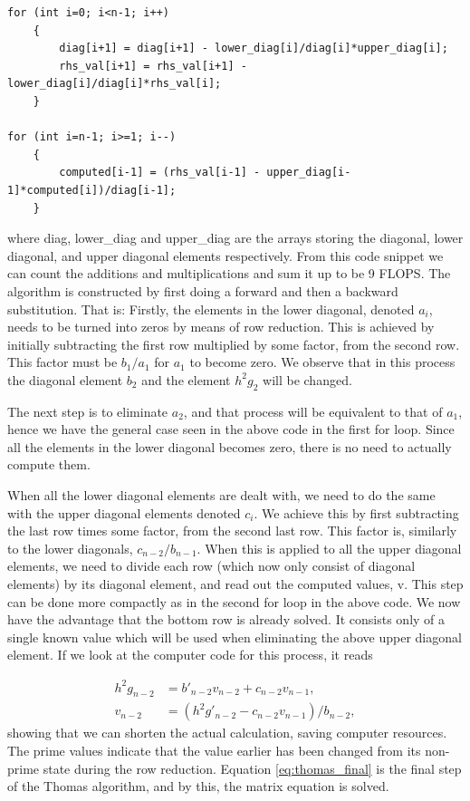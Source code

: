 \documentclass{emulateapj}
\begin{document}
\begin{lstlisting}
for (int i=0; i<n-1; i++)
    {
        diag[i+1] = diag[i+1] - lower_diag[i]/diag[i]*upper_diag[i];
        rhs_val[i+1] = rhs_val[i+1] - lower_diag[i]/diag[i]*rhs_val[i];
    }

for (int i=n-1; i>=1; i--)
    {
        computed[i-1] = (rhs_val[i-1] - upper_diag[i-1]*computed[i])/diag[i-1];
    }
\end{lstlisting}
where diag, lower\_diag and upper\_diag are the arrays storing the diagonal, lower diagonal, and upper diagonal elements respectively. From this code snippet we can count the additions and multiplications and sum it up to be 9 FLOPS. The algorithm is constructed by first doing a forward and then a backward substitution. That is: Firstly, the elements in the lower diagonal, denoted \( a_i\), needs to be turned into zeros by means of row reduction. This is achieved by initially subtracting the first row multiplied by some factor, from the second row. This factor must be \( b_1/a_1 \) for \( a_1 \) to become zero. We observe that in this process the diagonal element \( b_2 \) and the element \( h^2g_2 \) will be changed.

The next step is to eliminate \(a_2\), and that process will be equivalent to that of \(a_1 \), hence we have the general case seen in the above code in the first for loop. Since all the elements in the lower diagonal becomes zero, there is no need to actually compute them.

When all the lower diagonal elements are dealt with, we need to do the same with the upper diagonal elements denoted \( c_i \). We achieve this by first subtracting the last row times some factor, from the second last row. This factor is, similarly to the lower diagonals, \( c_{n-2}/b_{n-1} \). When this is applied to all the upper diagonal elements, we need to divide each row (which now only consist of diagonal elements) by its diagonal element, and read out the computed values, v. This step can be done more compactly as in the second for loop in the above code. We now have the advantage that the bottom row is already solved. It consists only of a single known value which will be used when eliminating the above upper diagonal element. If we look at the computer code for this process, it reads

\begin{align}
    h^2g_{n-2} &= b'_{n-2}v_{n-2} + c_{n-2}v_{n-1},
    \\ \label{eq:thomas_final}
    v_{n-2} &= (h^2g'_{n-2} - c_{n-2}v_{n-1})/b_{n-2},
\end{align}{}
showing that we can shorten the actual calculation, saving computer resources. The prime values indicate that the value earlier has been changed from its non-prime state during the row reduction. Equation \ref{eq:thomas_final} is the final step of the Thomas algorithm, and by this, the matrix equation is solved.
\end{document}
